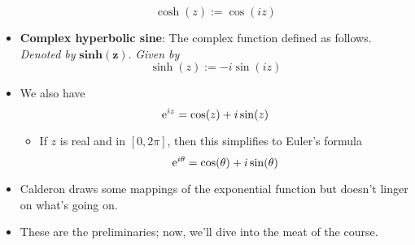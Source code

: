 \documentclass[../notes.tex]{subfiles}
\begin{document}
\begin{itemize}
    \begin{equation*}
        \cosh(z) := \cos(iz)
    \end{equation*}
    \item \textbf{Complex hyperbolic sine}: The complex function defined as follows. \emph{Denoted by} $\textbf{sinh}\bm{(z)}$. \emph{Given by}
    \begin{equation*}
        \sinh(z) := -i\sin(iz)
    \end{equation*}
    \item We also have
    \begin{equation*}
        \e[iz] = \cos(z)+i\sin(z)
    \end{equation*}
    \begin{itemize}
        \item If $z$ is real and in $[0,2\pi]$, then this simplifies to Euler's formula
        \begin{equation*}
            \e[i\theta] = \cos(\theta)+i\sin(\theta)
        \end{equation*}
    \end{itemize}
    \item Calderon draws some mappings of the exponential function but doesn't linger on what's going on.
    \item These are the preliminaries; now, we'll dive into the meat of the course.
\end{itemize}
\end{document}
